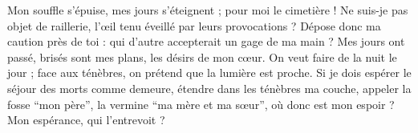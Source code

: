 \lettrine{M}{}on souffle s’épuise, mes jours s’éteignent ; pour moi le cimetière !
Ne suis-je pas objet de raillerie, l’œil tenu éveillé par leurs provocations ?
Dépose donc ma caution près de toi : qui d’autre accepterait un gage de ma main ?
Mes jours ont passé, brisés sont mes plans, les désirs de mon cœur.
On veut faire de la nuit le jour ; face aux ténèbres, on prétend que la lumière est proche.
Si je dois espérer le séjour des morts comme demeure, étendre dans les ténèbres ma couche, 
appeler la fosse “mon père”, la vermine “ma mère et ma sœur”,
où donc est mon espoir ? Mon espérance, qui l’entrevoit ?